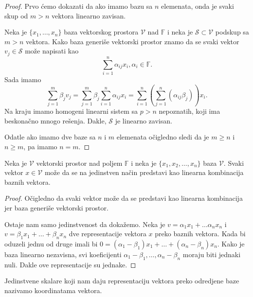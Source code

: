 \documentclass{article}
\begin{document}
\begin{proof}
  Prvo ćemo dokazati da ako imamo bazu sa $n$ elemenata, onda je svaki skup od $m > n$ vektora linearno zavisan.
  
  Neka je $\{x_1, \ldots, x_n\}$ baza vektorskog prostora $\mathcal{V}$ nad $\mathbb{F}$ i neka je $\mathcal{S} \subset \mathcal{V}$ podskup sa $m > n$ vektora.
  Kako baza generiše vektorski prostor znamo da se svaki vektor $v_j \in \mathcal{S}$ može napisati kao
  \[\sum_{i = 1}^{n} \alpha_{ij} x_i, \alpha_i \in \mathbb{F}.\]
  Sada imamo
  \[\sum_{j = 1}^{m} \beta_j v_j = \sum_{j = 1}^{m} \beta_j \sum_{i = 1}^{n} \alpha_{ij} x_i = \sum_{i = 1}^{n} (\sum_{j = 1}^{n} (\alpha_{ij} \beta_j)) x_i.\]
  Na kraju imamo homogeni linearni sistem sa $p > n$ nepoznatih, koji ima beskonačno mnogo rešenja.
  Dakle, $\mathcal{S}$ je linearno zavisan.

  Odatle ako imamo dve baze sa $n$ i $m$ elemenata očigledno sledi da je $m \ge n$ i $n \ge m$, pa imamo $n = m$.
\end{proof}

\begin{theorem}
  Neka je $\mathcal{V}$ vektorski prostor nad poljem $\mathbb{F}$ i neka je $\{x_1, x_2, \ldots, x_n\}$ baza $\mathcal{V}$.
  Svaki vektor $x \in \mathcal{V}$ može da se na jedinstven način predstavi kao linearna kombinacija baznih vektora.
\end{theorem}

\begin{proof}
  Očigledno da svaki vektor može da se predstavi kao linearna kombinacija jer baza generiše vektorski prostor.

  Ostaje nam samo jedinstvenost da dokažemo.
  Neka je $v = \alpha_1 x_1 + \ldots \alpha_n x_n$ i $ v = \beta_1 x_1 + \ldots + \beta_n x_n$ dve representacije vektora $x$ preko baznih vektora.
  Kada bi oduzeli jednu od druge imali bi $0 = (\alpha_1 - \beta_1) x_1 + \ldots + (\alpha_n - \beta_n) x_n$.
  Kako je baza linearno nezavisna, svi koeficijenti $\alpha_1 - \beta_1, \ldots, \alpha_n - \beta_n$ moraju biti jednaki nuli.
  Dakle ove representacije su jednake.
\end{proof}

Jedinstvene skalare koji nam daju representaciju vektora preko odredjene baze nazivamo koordinatama vektora.
\end{document}
